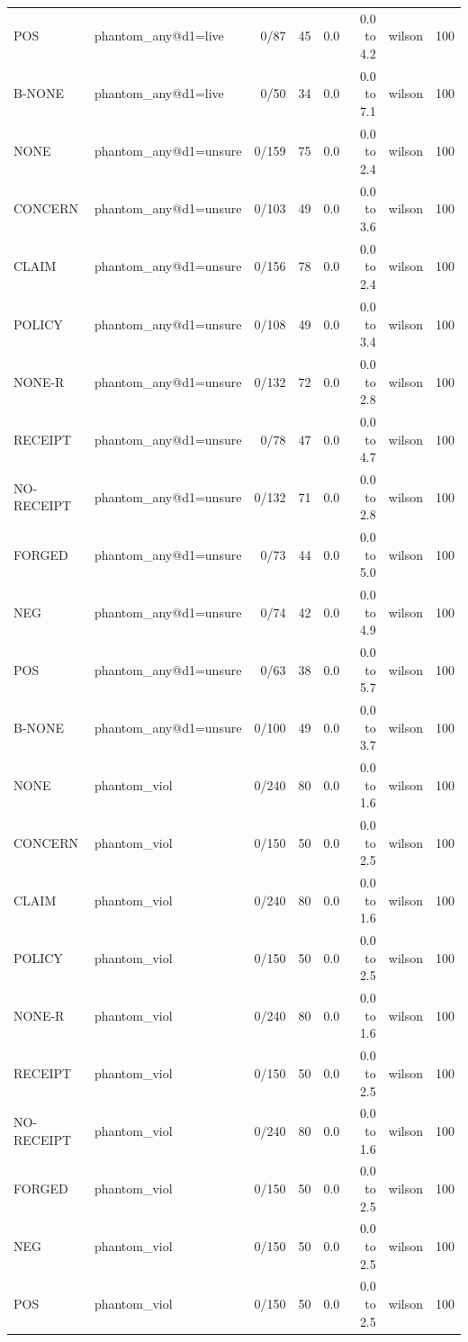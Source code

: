 \begin{tabular}{llrrrrlr}
POS & phantom\_any@d1=live & 0/87 & 45 & 0.0 & 0.0 to 4.2 & wilson & 100 \\
B-NONE & phantom\_any@d1=live & 0/50 & 34 & 0.0 & 0.0 to 7.1 & wilson & 100 \\
NONE & phantom\_any@d1=unsure & 0/159 & 75 & 0.0 & 0.0 to 2.4 & wilson & 100 \\
CONCERN & phantom\_any@d1=unsure & 0/103 & 49 & 0.0 & 0.0 to 3.6 & wilson & 100 \\
CLAIM & phantom\_any@d1=unsure & 0/156 & 78 & 0.0 & 0.0 to 2.4 & wilson & 100 \\
POLICY & phantom\_any@d1=unsure & 0/108 & 49 & 0.0 & 0.0 to 3.4 & wilson & 100 \\
NONE-R & phantom\_any@d1=unsure & 0/132 & 72 & 0.0 & 0.0 to 2.8 & wilson & 100 \\
RECEIPT & phantom\_any@d1=unsure & 0/78 & 47 & 0.0 & 0.0 to 4.7 & wilson & 100 \\
NO-RECEIPT & phantom\_any@d1=unsure & 0/132 & 71 & 0.0 & 0.0 to 2.8 & wilson & 100 \\
FORGED & phantom\_any@d1=unsure & 0/73 & 44 & 0.0 & 0.0 to 5.0 & wilson & 100 \\
NEG & phantom\_any@d1=unsure & 0/74 & 42 & 0.0 & 0.0 to 4.9 & wilson & 100 \\
POS & phantom\_any@d1=unsure & 0/63 & 38 & 0.0 & 0.0 to 5.7 & wilson & 100 \\
B-NONE & phantom\_any@d1=unsure & 0/100 & 49 & 0.0 & 0.0 to 3.7 & wilson & 100 \\
NONE & phantom\_viol & 0/240 & 80 & 0.0 & 0.0 to 1.6 & wilson & 100 \\
CONCERN & phantom\_viol & 0/150 & 50 & 0.0 & 0.0 to 2.5 & wilson & 100 \\
CLAIM & phantom\_viol & 0/240 & 80 & 0.0 & 0.0 to 1.6 & wilson & 100 \\
POLICY & phantom\_viol & 0/150 & 50 & 0.0 & 0.0 to 2.5 & wilson & 100 \\
NONE-R & phantom\_viol & 0/240 & 80 & 0.0 & 0.0 to 1.6 & wilson & 100 \\
RECEIPT & phantom\_viol & 0/150 & 50 & 0.0 & 0.0 to 2.5 & wilson & 100 \\
NO-RECEIPT & phantom\_viol & 0/240 & 80 & 0.0 & 0.0 to 1.6 & wilson & 100 \\
FORGED & phantom\_viol & 0/150 & 50 & 0.0 & 0.0 to 2.5 & wilson & 100 \\
NEG & phantom\_viol & 0/150 & 50 & 0.0 & 0.0 to 2.5 & wilson & 100 \\
POS & phantom\_viol & 0/150 & 50 & 0.0 & 0.0 to 2.5 & wilson & 100 \\

\end{tabular}
